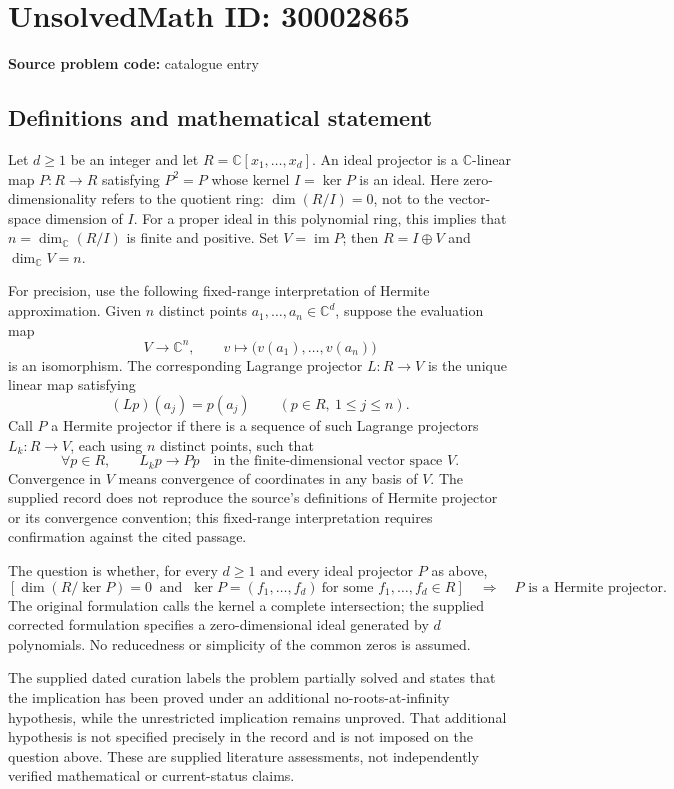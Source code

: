 \documentclass[11pt]{article}
\newcommand{\C}{\mathbb{C}}
\begin{document}
\section*{UnsolvedMath ID: 30002865}
\textbf{Source problem code:} catalogue entry
\subsection{Definitions and mathematical statement}
Let \(d\geq 1\) be an integer and let \(R=\C[x_1,\ldots,x_d]\). An ideal projector is a \(\C\)-linear map \(P:R\to R\) satisfying \(P^2=P\) whose kernel \(I=\ker P\) is an ideal. Here zero-dimensionality refers to the quotient ring: \(\dim(R/I)=0\), not to the vector-space dimension of \(I\). For a proper ideal in this polynomial ring, this implies that \(n=\dim_{\C}(R/I)\) is finite and positive. Set \(V=\operatorname{im}P\); then \(R=I\oplus V\) and \(\dim_{\C}V=n\).

For precision, use the following fixed-range interpretation of Hermite approximation. Given \(n\) distinct points \(a_1,\ldots,a_n\in\C^d\), suppose the evaluation map
\[
V\longrightarrow\C^n,\qquad v\longmapsto\bigl(v(a_1),\ldots,v(a_n)\bigr)
\]
is an isomorphism. The corresponding Lagrange projector \(L:R\to V\) is the unique linear map satisfying
\[
(Lp)(a_j)=p(a_j)\qquad(p\in R,\ 1\leq j\leq n).
\]
Call \(P\) a Hermite projector if there is a sequence of such Lagrange projectors \(L_k:R\to V\), each using \(n\) distinct points, such that
\[
\forall p\in R,\qquad L_kp\longrightarrow Pp\quad\text{in the finite-dimensional vector space }V.
\]
Convergence in \(V\) means convergence of coordinates in any basis of \(V\). The supplied record does not reproduce the source's definitions of Hermite projector or its convergence convention; this fixed-range interpretation requires confirmation against the cited passage.

The question is whether, for every \(d\geq1\) and every ideal projector \(P\) as above,
\[
\left[\dim(R/\ker P)=0\ \text{ and }\ \ker P=(f_1,\ldots,f_d)\ \text{for some }f_1,\ldots,f_d\in R\right]
\quad\Longrightarrow\quad
P\text{ is a Hermite projector}.
\]
The original formulation calls the kernel a complete intersection; the supplied corrected formulation specifies a zero-dimensional ideal generated by \(d\) polynomials. No reducedness or simplicity of the common zeros is assumed.

The supplied dated curation labels the problem partially solved and states that the implication has been proved under an additional no-roots-at-infinity hypothesis, while the unrestricted implication remains unproved. That additional hypothesis is not specified precisely in the record and is not imposed on the question above. These are supplied literature assessments, not independently verified mathematical or current-status claims.
\end{document}
